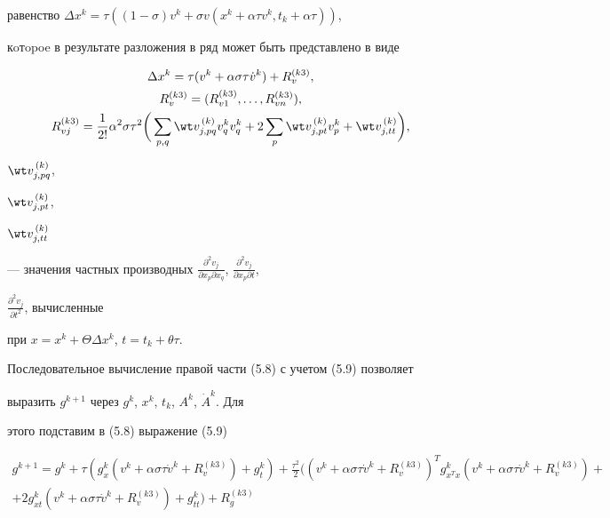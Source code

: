 равенство $\Delta x^k=\tau((1-\sigma)v^k+\sigma v(x^k+\alpha\tau 


v^k,t_k+\alpha\tau))$, 


кoтopoe в результате разложения в ряд может быть представлено в виде 


\begin{gather} 


\Delta x^k=\tau(v^k+\alpha\sigma\tau\Dot v^k)+R^{(k3)}_v,\\ 


R^{(k3)}_v=(R^{(k3)}_{v1},\dotsc,R^{(k3)}_{v n}),\notag \\ 


R^{(k3)}_{v j}=\frac{1}{2!}\alpha^2\sigma\tau^2\bigg( 


\sum_{p,q}\wt v^{\,(k)}_{j,p q}v^k_q v^k_q+2\sum_p 


\wt v^{\,(k)}_{j,p t}v^k_p+\wt v^{\,(k)}_{j,t t}\bigg),\notag 


\end{gather} 


$\wt v^{\,(k)}_{j,p q}$, 


$\wt v^{\,(k)}_{j,p t}$, 


$\wt v^{\,(k)}_{j,t t}$ 


--- значения частных производных $\frac{\partial^2v_j}{\partial 


x_p\partial x_q}$, $\frac{\partial^2 v_j}{\partial x_p\partial t}$, 


$\frac{\partial^2v_j}{\partial t^2}$, вычисленные 


при $x=x^k+\Theta\Delta x^k$, $t=t_k+\theta\tau$. 


 


Последовательное вычисление правой части (5.8) с учетом (5.9) позволяет 


выразить $g^{k+1}$ через $g^k$, $x^k$, $t_k$, $A^k$, $\Dot A^k$. Для 


этого подставим в (5.8) выражение (5.9) 


\begin{multline} 


g^{k+1}=g^k+\tau(g^k_x(v^k+\alpha\sigma\tau\Dot v^k+ 


R^{(k3)}_v)+g^k_t)+ 


\frac{\tau^2}{2}((v^k+\alpha\sigma\tau\Dot v^k+R^{(k3)}_v)^T 


g^k_{x^T x}(v^k+\alpha\sigma\tau\Dot v^k+R^{(k3)}_v)+ \\


+2g^k_{x t}(v^k+\alpha\sigma\tau\Dot v^k+R^{(k3)}_v)+ 


g^k_{t t})+R^{(k3)}_g 


\end{multline} 


